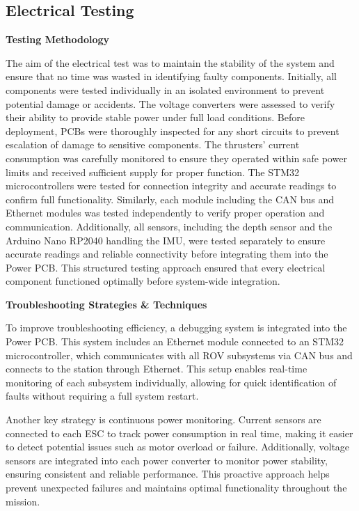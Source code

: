 \subsection{Electrical Testing}

\textbf{Testing Methodology}

The aim of the electrical test was to maintain the stability of the system and ensure that no time was wasted in identifying faulty components. Initially, all components were tested individually in an isolated environment to prevent potential damage or accidents. The voltage converters were assessed to verify their ability to provide stable power under full load conditions. Before deployment, PCBs were thoroughly inspected for any short circuits to prevent escalation of damage to sensitive components. The thrusters' current consumption was carefully monitored to ensure they operated within safe power limits and received sufficient supply for proper function. The STM32 microcontrollers were tested for connection integrity and accurate readings to confirm full functionality. Similarly, each module including the CAN bus and Ethernet modules was tested independently to verify proper operation and communication. Additionally, all sensors, including the depth sensor and the Arduino Nano RP2040 handling the IMU, were tested separately to ensure accurate readings and reliable connectivity before integrating them into the Power PCB. This structured testing approach ensured that every electrical component functioned optimally before system-wide integration.

\vspace{0.5cm}
\textbf{Troubleshooting Strategies \& Techniques}

To improve troubleshooting efficiency, a debugging system is integrated into the Power PCB. This system includes an Ethernet module connected to an STM32 microcontroller, which communicates with all ROV subsystems via CAN bus and connects to the station through Ethernet. This setup enables real-time monitoring of each subsystem individually, allowing for quick identification of faults without requiring a full system restart.

\hspace{10pt} Another key strategy is continuous power monitoring. Current sensors are connected to each ESC to track power consumption in real time, making it easier to detect potential issues such as motor overload or failure. Additionally, voltage sensors are integrated into each power converter to monitor power stability, ensuring consistent and reliable performance. This proactive approach helps prevent unexpected failures and maintains optimal functionality throughout the mission.

